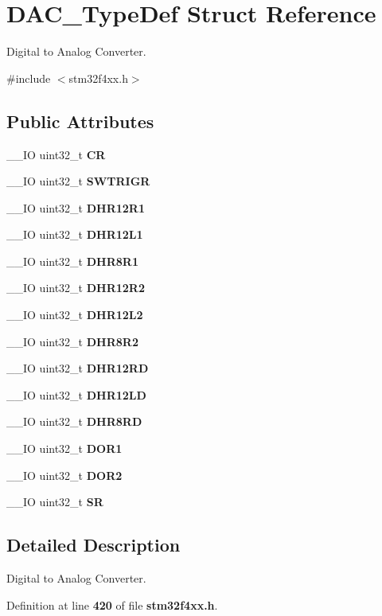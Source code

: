 \section{D\+A\+C\+\_\+\+Type\+Def Struct Reference}
\label{structDAC__TypeDef}


Digital to Analog Converter.  




{\ttfamily \#include $<$stm32f4xx.\+h$>$}

\subsection*{Public Attributes}
\begin{DoxyCompactItemize}
\item 
\+\_\+\+\_\+\+IO uint32\+\_\+t \textbf{ CR}
\item 
\+\_\+\+\_\+\+IO uint32\+\_\+t \textbf{ S\+W\+T\+R\+I\+GR}
\item 
\+\_\+\+\_\+\+IO uint32\+\_\+t \textbf{ D\+H\+R12\+R1}
\item 
\+\_\+\+\_\+\+IO uint32\+\_\+t \textbf{ D\+H\+R12\+L1}
\item 
\+\_\+\+\_\+\+IO uint32\+\_\+t \textbf{ D\+H\+R8\+R1}
\item 
\+\_\+\+\_\+\+IO uint32\+\_\+t \textbf{ D\+H\+R12\+R2}
\item 
\+\_\+\+\_\+\+IO uint32\+\_\+t \textbf{ D\+H\+R12\+L2}
\item 
\+\_\+\+\_\+\+IO uint32\+\_\+t \textbf{ D\+H\+R8\+R2}
\item 
\+\_\+\+\_\+\+IO uint32\+\_\+t \textbf{ D\+H\+R12\+RD}
\item 
\+\_\+\+\_\+\+IO uint32\+\_\+t \textbf{ D\+H\+R12\+LD}
\item 
\+\_\+\+\_\+\+IO uint32\+\_\+t \textbf{ D\+H\+R8\+RD}
\item 
\+\_\+\+\_\+\+IO uint32\+\_\+t \textbf{ D\+O\+R1}
\item 
\+\_\+\+\_\+\+IO uint32\+\_\+t \textbf{ D\+O\+R2}
\item 
\+\_\+\+\_\+\+IO uint32\+\_\+t \textbf{ SR}
\end{DoxyCompactItemize}


\subsection{Detailed Description}
Digital to Analog Converter. 

Definition at line \textbf{ 420} of file \textbf{ stm32f4xx.\+h}.



